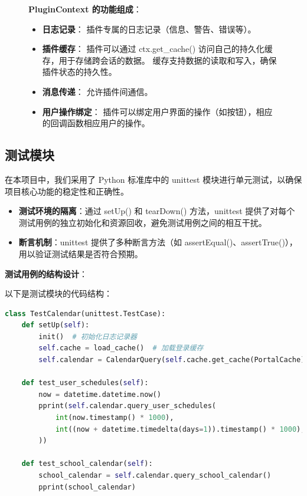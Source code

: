 \documentclass[14pt,a4paper,UTF8,twoside]{article}
\renewcommand{\texttt}[1]{{\color{blue}\ttfamily#1}}
\begin{document}
\begin{figure}[H]
{\begin{minipage}[H]{0.4\textwidth}
\begin{tikzpicture}
        \end{tikzpicture}
    \end{minipage}
    \hspace{2.5cm}
    \begin{minipage}[H]{0.6\textwidth}
        \textbf{PluginContext 的功能组成}：
        \begin{itemize}
            \item \textbf{日志记录}：
            插件专属的日志记录（信息、警告、错误等）。
            \item \textbf{插件缓存}：
            插件可以通过 \texttt{ctx.get\_cache()} 访问自己的持久化缓存，用于存储跨会话的数据。
            缓存支持数据的读取和写入，确保插件状态的持久性。
            \item \textbf{消息传递}：
            允许插件间通信。
            \item \textbf{用户操作绑定}：
            插件可以绑定用户界面的操作（如按钮），相应的回调函数相应用户的操作。
        \end{itemize}
    \end{minipage}
    }
\end{figure}

\subsection{测试模块}

在本项目中，我们采用了 Python 标准库中的 \texttt{unittest} 模块进行单元测试，以确保项目核心功能的稳定性和正确性。

\begin{itemize}
    \item \textbf{测试环境的隔离}：通过 \texttt{setUp()} 和 \texttt{tearDown()} 方法，\texttt{unittest} 提供了对每个测试用例的独立初始化和资源回收，避免测试用例之间的相互干扰。
    \item \textbf{断言机制}：\texttt{unittest} 提供了多种断言方法（如 \texttt{assertEqual()}、\texttt{assertTrue()}），用以验证测试结果是否符合预期。
\end{itemize}

\textbf{测试用例的结构设计}：

以下是测试模块的代码结构：
\begin{lstlisting}[language=Python]
class TestCalendar(unittest.TestCase):
    def setUp(self):
        init()  # 初始化日志记录器
        self.cache = load_cache()  # 加载登录缓存
        self.calendar = CalendarQuery(self.cache.get_cache(PortalCache))

    def test_user_schedules(self):
        now = datetime.datetime.now()
        pprint(self.calendar.query_user_schedules(
            int(now.timestamp() * 1000),
            int((now + datetime.timedelta(days=1)).timestamp() * 1000),
        ))

    def test_school_calendar(self):
        school_calendar = self.calendar.query_school_calendar()
        pprint(school_calendar)
\end{lstlisting}
\end{document}
